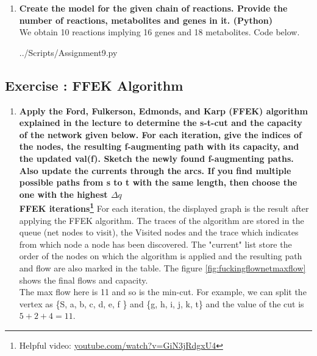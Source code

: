 \documentclass[10pt,a4paper]{article}
\newcommand{\exercise}[1]
{
  \stepcounter{subsection}
  \subsection*{Exercise \thesubsection: #1}

}
\begin{document}
\begin{enumerate}
	
	
	\item \textbf{Create the model for the given chain of reactions. Provide the number of reactions, metabolites and genes in it. (Python) }\\
	
	We obtain 10 reactions implying 16 genes and 18 metabolites. Code below.
	
	
	
	 {../Scripts/Assignment9.py}
	
	
\end{enumerate}



\newpage
\exercise{FFEK Algorithm}
\begin{enumerate}
	
	\item \textbf{Apply the Ford, Fulkerson, Edmonds, and Karp (FFEK) algorithm explained in the lecture to
		determine the s-t-cut and the capacity of the network given below.
		For each iteration, give the indices of the nodes, the resulting f-augmenting path with its capacity,
		and the updated val(f). Sketch the newly found f-augmenting paths. Also update the currents
		through the arcs.
		If you find multiple possible paths from s to t with the same length, then choose the one with the
		highest $\Delta q$}\\
	
	
	
	\textbf{FFEK iterations\footnote{Helpful video: \url{youtube.com/watch?v=GiN3jRdgxU4}}} For each iteration, the displayed graph is the result after applying the FFEK algorithm. The traces of the algorithm are stored in the queue (net nodes to visit), the Visited nodes and the trace which indicates from which node a node has been discovered. The "current" list store the order of the nodes on which the algorithm is applied and the resulting path and flow are also marked in the table. The figure \ref{fig:fuckingflownetmaxflow} shows the final flows and capacity.\\
	
	The max flow here is 11 and so is the min-cut. For example, we can split the vertex as \{S, a, b, c, d, e, f \} and \{g, h, i, j, k, t\} and the value of the cut is $ 5 + 2 + 4 = 11 $.
	
	
	

\end{enumerate}
\end{document}
